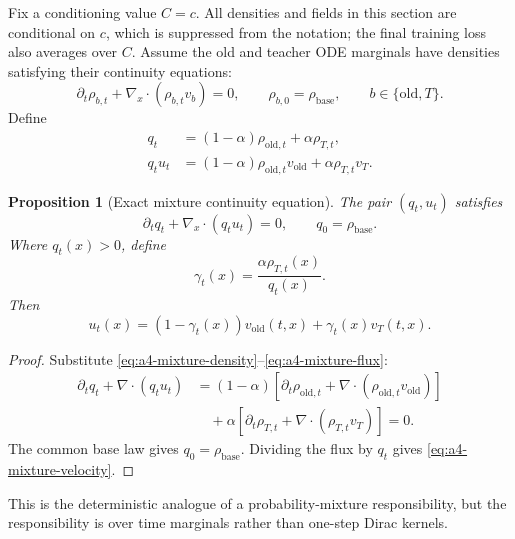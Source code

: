 \documentclass[11pt,a4paper]{article}
\newcommand{\vold}{v_{\mathrm{old}}}
\newcommand{\vT}{v_T}
\theoremstyle{plain}
\newtheorem{proposition}[theorem]{Proposition}
\theoremstyle{definition}
\begin{document}
Fix a conditioning value $C=c$.  All densities and fields in this section are conditional on
$c$, which is suppressed from the notation; the final training loss also averages over $C$.
Assume the old and teacher ODE marginals have densities satisfying their continuity equations:
\begin{equation}
\partial_t\rho_{b,t}
+\nabla_x\!\cdot(\rho_{b,t}v_b)=0,
\qquad
\rho_{b,0}=\rho_{\mathrm{base}},
\qquad
b\in\{\mathrm{old},T\}.
\label{eq:a4-source-continuity}
\end{equation}
Define
\begin{align}
q_t
&=(1-\alpha)\rho_{\mathrm{old},t}+\alpha\rho_{T,t},
\label{eq:a4-mixture-density}\\
q_tu_t
&=(1-\alpha)\rho_{\mathrm{old},t}\vold
  +\alpha\rho_{T,t}\vT .
\label{eq:a4-mixture-flux}
\end{align}

\begin{proposition}[Exact mixture continuity equation]
\label{prop:a4-continuity}
The pair $(q_t,u_t)$ satisfies
\begin{equation}
\partial_tq_t+\nabla_x\!\cdot(q_tu_t)=0,
\qquad
q_0=\rho_{\mathrm{base}}.
\label{eq:a4-continuity}
\end{equation}
Where $q_t(x)>0$, define
\begin{equation}
\gamma_t(x)
=
\frac{\alpha\rho_{T,t}(x)}{q_t(x)}.
\label{eq:a4-marginal-responsibility}
\end{equation}
Then
\begin{equation}
u_t(x)
=(1-\gamma_t(x))\vold(t,x)
+\gamma_t(x)\vT(t,x).
\label{eq:a4-mixture-velocity}
\end{equation}
\end{proposition}

\begin{proof}
Substitute \eqref{eq:a4-mixture-density}--\eqref{eq:a4-mixture-flux}:
\begin{align*}
\partial_tq_t+\nabla\!\cdot(q_tu_t)
&=(1-\alpha)
  [\partial_t\rho_{\mathrm{old},t}
   +\nabla\!\cdot(\rho_{\mathrm{old},t}\vold)]\\
&\quad
  +\alpha
  [\partial_t\rho_{T,t}
   +\nabla\!\cdot(\rho_{T,t}\vT)]
=0.
\end{align*}
The common base law gives $q_0=\rho_{\mathrm{base}}$.  Dividing the flux by $q_t$ gives
\eqref{eq:a4-mixture-velocity}.
\end{proof}

This is the deterministic analogue of a probability-mixture responsibility, but the
responsibility is over time marginals rather than one-step Dirac kernels.
\end{document}
